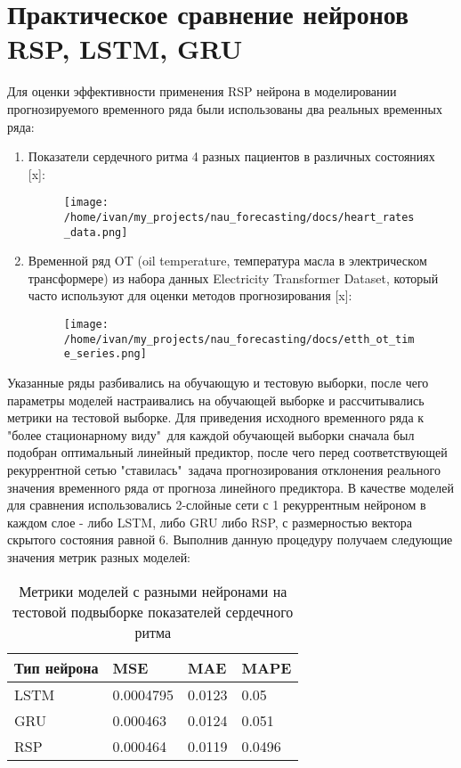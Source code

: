 \documentclass[11pt]{article}
\begin{document}
\section*{Практическое сравнение нейронов RSP, LSTM, GRU}
Для оценки эффективности применения RSP нейрона в моделировании прогнозируемого временного ряда были использованы два реальных временных ряда:
\begin{enumerate}
  \item Показатели сердечного ритма 4 разных пациентов в различных состояниях [x]:
\begin{figure}[H]
\centering
\texttt{[image: /home/ivan/my\_projects/nau\_forecasting/docs/heart\_rates\_data.png]}
\label{}
\end{figure}
  \item Временной ряд OT (oil temperature, температура масла в электрическом трансформере) из набора данных Electricity Transformer Dataset, который часто используют для оценки методов прогнозирования [x]:
\begin{figure}[H]
\centering
\texttt{[image: /home/ivan/my\_projects/nau\_forecasting/docs/etth\_ot\_time\_series.png]}
\label{}
\end{figure}
\end{enumerate}

Указанные ряды разбивались на обучающую и тестовую выборки, после чего параметры моделей настраивались на обучающей выборке и рассчитывались метрики на тестовой выборке.
Для приведения исходного временного ряда к "более стационарному виду"\ для каждой обучающей выборки сначала был подобран оптимальный линейный предиктор, после чего перед соответствующей рекуррентной сетью "ставилась"\ задача прогнозирования отклонения реального значения временного ряда от прогноза линейного предиктора.  
В качестве моделей для сравнения использовались 2-слойные сети с 1 рекуррентным нейроном в каждом слое - либо LSTM, либо GRU либо RSP, с размерностью вектора скрытого состояния равной 6.
Выполнив данную процедуру получаем следующие значения метрик разных моделей:


\begin{table}[H]
\caption{Метрики моделей с разными нейронами на тестовой подвыборке показателей сердечного ритма}
\begin{tabular}{ |p{3cm}|p{3cm}|p{3cm}|p{3cm}|  }
 \hline
  Тип нейрона & MSE &  MAE & MAPE \\
 \hline
 LSTM & 0.0004795 & 0.0123 & 0.05 \\
 \hline
 GRU & 0.000463 & 0.0124 & 0.051 \\
 \hline 
 RSP & 0.000464 & 0.0119 & 0.0496 \\
 \hline
\end{tabular}
\end{table}
\end{document}
